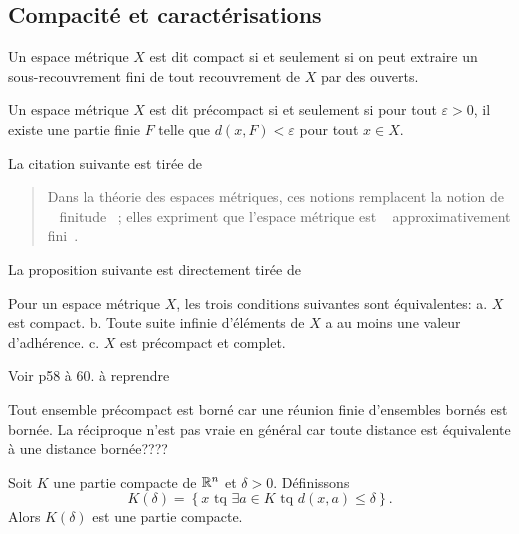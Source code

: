 \subsection{Compacité et caractérisations}
\begin{defi}
 Un espace métrique $X$ est dit compact si et seulement si on peut extraire un sous-recouvrement fini de tout recouvrement de $X$ par des ouverts.
\end{defi}
\begin{defin}\label{Def:PreCompct}
 Un espace métrique $X$ est dit précompact si et seulement si pour tout $\varepsilon >0$, il existe une partie finie $F$ telle que $d(x,F) < \varepsilon$ pour tout $x \in X$.
\end{defin}
\noindent La citation suivante est tirée de \cite{dieudonne1969elements}
\begin{quotation}
 Dans la théorie des espaces métriques, ces notions remplacent la notion de \og~ finitude ~\fg{}; elles expriment que l'espace métrique est \og~ approximativement fini~\fg{}.
\end{quotation}
La proposition suivante est directement tirée de \cite{dieudonne1969elements}
\begin{propn}\label{prop:CaracCompact}
 Pour un espace métrique $X$, les trois conditions suivantes sont équivalentes:\newline
 a. $X$ est compact.\newline
 b. Toute suite infinie d'éléments de $X$ a au moins une valeur d'adhérence.\newline
 c. $X$ est précompact et complet.
\end{propn}
\begin{demo}
 Voir \cite{dieudonne1969elements} p58 à 60. à reprendre
\end{demo}
\begin{rem}
 Tout ensemble précompact est borné car une réunion finie d'ensembles bornés est bornée. La réciproque n'est pas vraie en général car toute distance est équivalente à une distance bornée????
\end{rem}
\begin{propn} \label{compactEtendu}
Soit $K$ une partie compacte de $\mathbb{R}^n$ et $\delta >0$. Définissons
\begin{displaymath}
 K(\delta) = \left\lbrace x \text{ tq } \exists a \in K \text{ tq } d(x,a)\leq \delta  \right\rbrace.
\end{displaymath}
Alors $K(\delta)$ est une partie compacte.
\end{propn}
